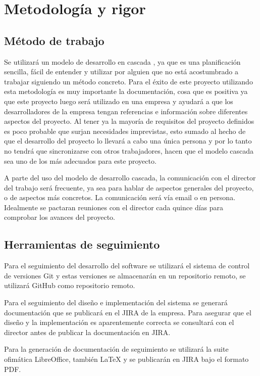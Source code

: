 \chapter{Metodología y rigor}
\section{Método de trabajo}
Se utilizará un modelo de desarrollo en cascada \cite{Tfg:waterfall}, ya que es una planificación sencilla, fácil de entender y utilizar por alguien que no está acostumbrado a trabajar siguiendo un método concreto. Para el éxito de este proyecto utilizando esta metodología es muy importante la documentación, cosa que es positiva ya que este proyecto luego será utilizado en una empresa y ayudará a que los desarrolladores de la empresa tengan referencias e información sobre diferentes aspectos del proyecto. Al tener ya la mayoría de requisitos del proyecto definidos es poco probable que surjan necesidades imprevistas, esto sumado al hecho de que el desarrollo del proyecto lo llevará a cabo una única persona y por lo tanto no tendrá que sincronizarse con otros trabajadores, hacen que el modelo cascada sea uno de los más adecuados para este proyecto.

A parte del uso del modelo de desarrollo cascada, la comunicación con el director del trabajo será frecuente, ya sea para hablar de aspectos generales del proyecto, o de aspectos más concretos. La comunicación será vía email o en persona. Idealmente se pactaran reuniones con el director cada quince días para comprobar los avances del proyecto. 

\section{Herramientas de seguimiento}
Para el seguimiento del desarrollo del software se utilizará el sistema de control de versiones Git y estas versiones se almacenarán en un repositorio remoto, se utilizará GitHub como repositorio remoto.

Para el seguimiento del diseño e implementación del sistema se generará documentación que se publicará en el JIRA de la empresa. Para asegurar que el diseño y la implementación es aparentemente correcta se consultará con el director antes de publicar la documentación en JIRA.

Para la generación de documentación de seguimiento se utilizará la suite ofimática LibreOffice, también LaTeX y se publicarán en JIRA bajo el formato PDF.

